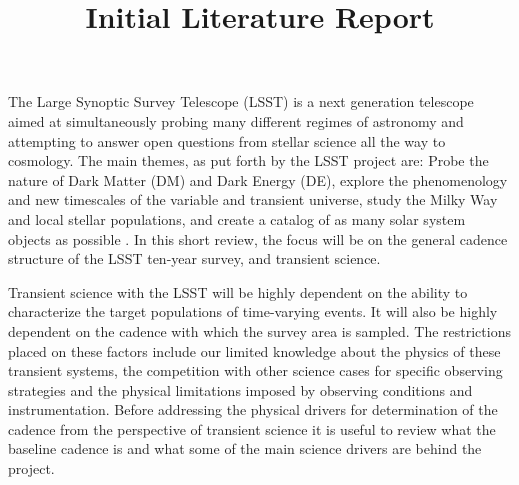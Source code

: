 \documentclass[11pt]{article}
\title{Initial Literature Report}
\begin{document}
\par
\vspace{7pt}
The Large Synoptic Survey Telescope (LSST) is a next generation telescope aimed at simultaneously probing many different regimes of astronomy and attempting to answer open questions from stellar science all the way to cosmology. The main themes, as put forth by the LSST project are: Probe the nature of Dark Matter (DM) and Dark Energy (DE), explore the phenomenology and new timescales of the variable and transient universe, study the Milky Way and local stellar populations, and create a catalog of as many solar system objects as possible \cite{LSSTScienceCollaboration2017}. In this short review, the focus will be on the general cadence structure of the LSST ten-year survey, and transient science. \par
Transient science with the LSST will be highly dependent on the ability to characterize the target populations of time-varying events. It will also be highly dependent on the cadence with which the survey area is sampled. The restrictions placed on these factors include our limited knowledge about the physics of these transient systems, the competition with other science cases for specific observing strategies and the physical limitations imposed by observing conditions and instrumentation. Before addressing the physical drivers for determination of the cadence from the perspective of transient science it is useful to review what the baseline cadence is and what some of the main science drivers are behind the project. \par
\end{document}
